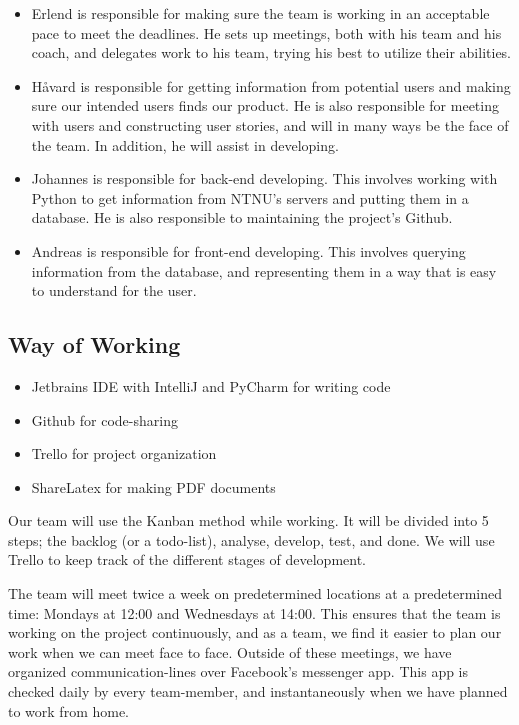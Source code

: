 \documentclass[pdftex, 12pt, norsk, a4paper, twoside]{article}
\numberwithin{equation}{section}
\numberwithin{figure}{section}
\numberwithin{table}{section}
\begin{document}
\begin{itemize}

\item Erlend is responsible for making sure the team is working in an acceptable pace to meet the deadlines. He sets up meetings, both with his team and his coach, and delegates work to his team, trying his best to utilize their abilities. \\

\item Håvard is responsible for getting information from potential users and making sure our intended users finds our product. He is also responsible for meeting with users and constructing user stories, and will in many ways be the face of the team. In addition, he will assist in developing. \\

\item Johannes is responsible for back-end developing. This involves working with Python to get information from NTNU's servers and putting them in a database. He is also responsible to maintaining the project's Github.\\

\item Andreas is responsible for front-end developing. This involves querying information from the database, and representing them in a way that is easy to understand for the user.

\end{itemize}


\subsection{Way of Working}
\begin{itemize}
    \item Jetbrains IDE with IntelliJ and PyCharm for writing code
    \item Github for code-sharing
    \item Trello for project organization
    \item ShareLatex for making PDF documents
\end{itemize}

Our team will use the Kanban method while working. It will be divided into 5 steps; the backlog (or a todo-list), analyse, develop, test, and done. We will use Trello to keep track of the different stages of development. 

\newpage
\hfill
\hfill

The team will meet twice a week on predetermined locations at a predetermined time: Mondays at 12:00 and Wednesdays at 14:00. This ensures that the team is working on the project continuously, and as a team, we find it easier to plan our work when we can meet face to face. Outside of these meetings, we have organized communication-lines over Facebook's messenger app. This app is checked daily by every team-member, and instantaneously when we have planned to work from home.
\end{document}
